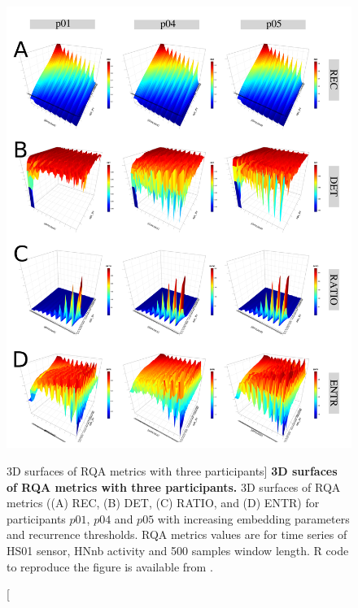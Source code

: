 \begin{figure}
\centering
\includegraphics[width=1.0\textwidth]{participants_w500}
    \caption
	[3D surfaces of RQA metrics with three participants]{
	{\bf 3D surfaces of RQA metrics with three participants.}
	3D surfaces of RQA metrics ((A) REC, (B) DET, (C) RATIO, and (D) ENTR) 
	for participants $p01$, $p04$ and $p05$ with increasing embedding 
	parameters and recurrence thresholds.
	RQA metrics values are for time series of HS01 sensor, 
	HNnb activity and 500 samples window length.
	R code to reproduce the figure is available from \cite{hwum2018}.
 }
\label{fig:topo_participants_hii}
\end{figure}


